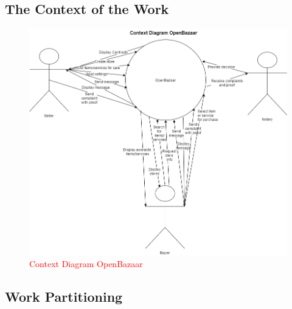 \documentclass{article}
\begin{document}
\subsection{The Context of the Work}
\begin{figure}[H]
\includegraphics[scale=0.5]{ContextDiagramOpenBazaar}
\caption{\textcolor{red}{Context Diagram OpenBazaar}}
\end{figure}

\subsection{Work Partitioning}
\end{document}
